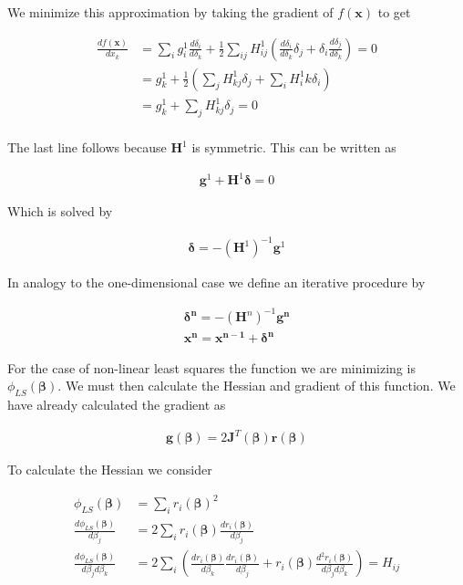 \documentclass[12pt]{article}
\newcommand{\bv}[1]{\boldsymbol{#1}}
\begin{document}
We minimize this approximation by taking the gradient of $f(\bv{x})$ to get

\begin{align}
\frac{df(\bv{x})}{dx_k} &= \sum_i g_i^1 \frac{d\delta_i}{d\delta_k} + \frac{1}{2} \sum_{ij}H_{ij}^1\left(\frac{d\delta_i}{d\delta_k} \delta_j + \delta_i \frac{d\delta_j}{d\delta_k} \right) = 0\\
&= g_k^1 + \frac{1}{2} \left(\sum_j H^1_{kj}\delta_j + \sum_i H^1_ik \delta_i\right)\\
&= g_k^1 + \sum_j H^1_{kj}\delta_j = 0\\
\end{align}

The last line follows because $\bv{H}^1$ is symmetric.
This can be written as

\begin{align}
\bv{g}^1 + \bv{H}^1 \bv{\delta} = 0
\end{align}

Which is solved by

\begin{align}
\bv{\delta} = -(\bv{H}^1)^{-1}\bv{g}^1
\end{align}

In analogy to the one-dimensional case we define an iterative procedure by

\begin{align}
\bv{\delta^n} = -(\bv{H}^n)^{-1}\bv{g^n}\\
\bv{x^n} = \bv{x^{n-1}} + \bv{\delta^n}
\end{align}

For the case of non-linear least squares the function we are minimizing is $\phi_{LS}(\bv{\beta})$.
We must then calculate the Hessian and gradient of this function. 
We have already calculated the gradient as

\begin{align}
\bv{g}(\bv{\beta}) = 2\bv{J}^T(\bv{\beta})\bv{r}(\bv{\beta})
\end{align}

To calculate the Hessian we consider

\begin{align}
\phi_{LS}(\bv{\beta}) &= \sum_i r_i(\bv{\beta})^2\\
\frac{d\phi_{LS}(\bv{\beta})}{d\beta_j} &= 2 \sum_i r_i(\bv{\beta})\frac{dr_i(\bv{\beta})}{d\beta_j}\\
\frac{d\phi_{LS}(\bv{\beta})}{d\beta_jd\beta_k} &= 2 \sum_i\left( \frac{dr_i(\bv{\beta})}{d\beta_k}\frac{dr_i(\bv{\beta})}{d\beta_j} + r_i(\bv{\beta})\frac{d^2r_i(\bv{\beta})}{d\beta_jd\beta_k}\right) = H_{ij}
\end{align}
\end{document}
